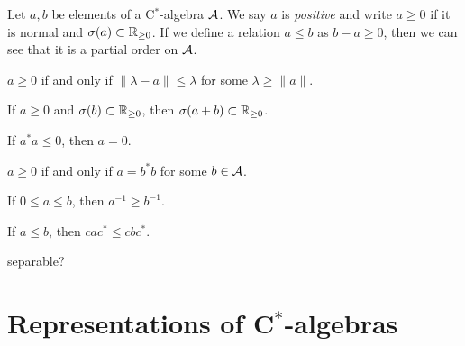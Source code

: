 \documentclass{../../large}
\begin{document}
\begin{prb}
Let $a,b$ be elements of a C$^*$-algebra $\mathcal{A}$.
We say $a$ is \emph{positive} and write $a\ge0$ if it is normal and $\sigma(a)\subset\mathbb{R}_{\ge0}$.
If we define a relation $a\le b$ as $b-a\ge0$, then we can see that it is a partial order on $\mathcal{A}$.
\begin{parts}
\item $a\ge0$ if and only if $\|\lambda-a\|\le\lambda$ for some $\lambda\ge\|a\|$.
\item If $a\ge0$ and $\sigma(b)\subset\mathbb{R}_{\ge0}$, then $\sigma(a+b)\subset\mathbb{R}_{\ge0}$.
\item If $a^*a\le0$, then $a=0$.
\item $a\ge0$ if and only if $a=b^*b$ for some $b\in\mathcal{A}$.
\end{parts}
\end{prb}
\begin{pf}

\end{pf}




\begin{prb}
\begin{parts}
\item If $0\le a\le b$, then $a^{-1}\ge b^{-1}$.
\item If $a\le b$, then $cac^*\le cbc^*$.
\end{parts}
\end{prb}

\begin{prb}
separable?

\end{prb}

\begin{prb}
\end{prb}






\section{Representations of C$^*$-algebras}
\end{document}
